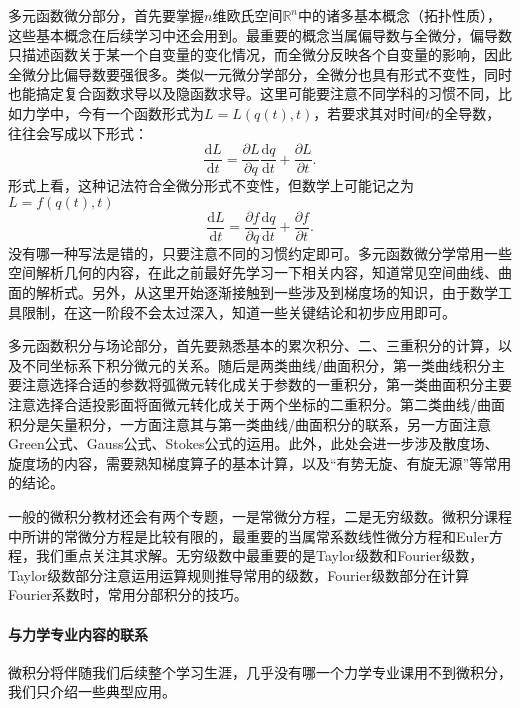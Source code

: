 多元函数微分部分，首先要掌握$n$维欧氏空间$\mathbb{R}^n$中的诸多基本概念（拓扑性质），这些基本概念在后续学习中还会用到。最重要的概念当属偏导数与全微分，偏导数只描述函数关于某一个自变量的变化情况，而全微分反映各个自变量的影响，因此全微分比偏导数要强很多。类似一元微分学部分，全微分也具有形式不变性，同时也能搞定复合函数求导以及隐函数求导。这里可能要注意不同学科的习惯不同，比如力学中，今有一个函数形式为$L=L(q(t),t)$，若要求其对时间$t$的全导数，往往会写成以下形式：
\[
	\frac{\mathrm{d}L}{\mathrm{d}t}=\frac{\partial L}{\partial q}\frac{\mathrm{d}q}{\mathrm{d}t}+\frac{\partial L}{\partial t}.
\]
形式上看，这种记法符合全微分形式不变性，但数学上可能记之为$L=f(q(t),t)$
\[
	\frac{\mathrm{d}L}{\mathrm{d}t}=\frac{\partial f}{\partial q}\frac{\mathrm{d}q}{\mathrm{d}t}+\frac{\partial f}{\partial t}.
\]
没有哪一种写法是错的，只要注意不同的习惯约定即可。多元函数微分学常用一些空间解析几何的内容，在此之前最好先学习一下相关内容，知道常见空间曲线、曲面的解析式。另外，从这里开始逐渐接触到一些涉及到梯度场的知识，由于数学工具限制，在这一阶段不会太过深入，知道一些关键结论和初步应用即可。

多元函数积分与场论部分，首先要熟悉基本的累次积分、二、三重积分的计算，以及不同坐标系下积分微元的关系。随后是两类曲线/曲面积分，第一类曲线积分主要注意选择合适的参数将弧微元转化成关于参数的一重积分，第一类曲面积分主要注意选择合适投影面将面微元转化成关于两个坐标的二重积分。第二类曲线/曲面积分是矢量积分，一方面注意其与第一类曲线/曲面积分的联系，另一方面注意Green公式、Gauss公式、Stokes公式的运用。此外，此处会进一步涉及散度场、旋度场的内容，需要熟知梯度算子的基本计算，以及“有势无旋、有旋无源”等常用的结论。

一般的微积分教材还会有两个专题，一是常微分方程，二是无穷级数。微积分课程中所讲的常微分方程是比较有限的，最重要的当属常系数线性微分方程和Euler方程，我们重点关注其求解。无穷级数中最重要的是Taylor级数和Fourier级数，Taylor级数部分注意运用运算规则推导常用的级数，Fourier级数部分在计算Fourier系数时，常用分部积分的技巧。

\paragraph{与力学专业内容的联系}

微积分将伴随我们后续整个学习生涯，几乎没有哪一个力学专业课用不到微积分，我们只介绍一些典型应用。

